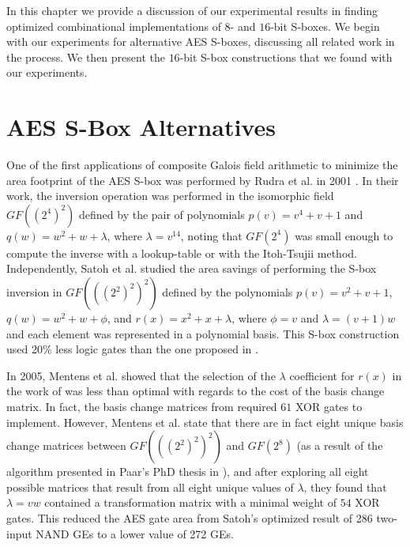 In this chapter we provide a discussion of our experimental results in finding optimized combinational implementations of $8$- and $16$-bit S-boxes. We begin with our experiments for alternative AES S-boxes, discussing all related work in the process. We then present the $16$-bit S-box constructions that we found with our experiments. 

\section{AES S-Box Alternatives}

One of the first applications of composite Galois field arithmetic to minimize the area footprint of the AES S-box was performed by Rudra et al. in 2001 \cite{Rudra01-1}. In their work, the inversion operation was performed in the isomorphic field $GF((2^4)^2)$ defined by the pair of polynomials $p(v) = v^4 + v + 1$ and $q(w) = w^2 + w + \lambda$, where $\lambda = v^{14}$, noting that $GF(2^4)$ was small enough to compute the inverse with a lookup-table or with the Itoh-Tsujii method. Independently, Satoh et al. \cite{Satoh01-1} studied the area savings of performing the S-box inversion in $GF(((2^2)^2)^2)$ defined by the polynomials $p(v) = v^2 + v + 1$, $q(w) = w^2 + w + \phi$, and $r(x) = x^2 + x + \lambda$, where $\phi = v$ and $\lambda = (v + 1)w$ and each element was represented in a polynomial basis. This S-box construction used 20\% less logic gates than the one proposed in \cite{Rudra01-1}.

In 2005, Mentens et al. \cite{Mentens05-1} showed that the selection of the $\lambda$ coefficient for $r(x)$ in the work of \cite{Satoh01-1} was less than optimal with regards to the cost of the basis change matrix. In fact, the basis change matrices from \cite{Satoh01-1} required $61$ XOR gates to implement. However, Mentens et al. state that there are in fact eight unique basis change matrices between $GF(((2^2)^2)^2)$ and $GF(2^8)$ (as a result of the algorithm presented in Paar's PhD thesis in \cite{Paar94-1}), and after exploring all eight possible matrices that result from all eight unique values of $\lambda$, they found that $\lambda = vw$ contained a transformation matrix with a minimal weight of $54$ XOR gates. This reduced the AES gate area from Satoh's optimized result of 286 two-input NAND GEs to a lower value of 272 GEs. 

